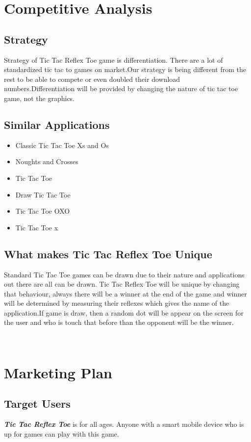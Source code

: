 \documentclass{article}
\begin{document}
\section{Competitive Analysis}
    \subsection{Strategy}
    Strategy of Tic Tac Reflex Toe game is differentiation. There are a lot of standardized tic tac to games on market.Our strategy is being different from  the rest to be able to compete or even doubled their download numbers.Differentiation will be provided by changing the nature of tic tac toe game, not the graphics.
    \subsection{Similar Applications}
    \begin{itemize}
        	\item Classic Tic Tac Toe Xs and Os
        	\item Noughts and Crosses
        	\item Tic Tac Toe
        	\item Draw Tic Tac Toe
        	\item Tic Tac Toe OXO
        	\item Tic Tac Toe x
        \end{itemize}
    
    \subsection{What makes Tic Tac Reflex Toe Unique}
    Standard Tic Tac Toe games can be drawn due to their nature and applications out there are all can be drawn. Tic Tac Reflex Toe will be unique by changing that behaviour, always there will be a winner at the end of the game and winner will be determined by measuring their reflexes which gives the name of the application.If game is draw, then a random dot will be appear on the screen for the user and who is touch that before than the opponent will be the winner.

~\newline
\section{Marketing Plan}
\subsection{Target Users}
    \textbf{\emph{Tic Tac Reflex Toe}} is for all ages.  Anyone with a smart mobile device who is up for games can play with this game.
\end{document}

